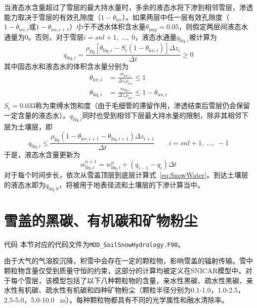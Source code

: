 当液态水含量超过了雪层的最大持水量时，多余的液态水将下渗到相邻雪层，渗透能力取决于雪层的有效孔隙度（$1-\theta_{\mathrm{ice}}$）。如果两层中任一层有效孔隙度（$1-\theta_{\mathrm{ice},i}$或$1-\theta_{\mathrm{ice},i+1}$）小于不透水体积含水量$\theta_{\mathrm{imp}}=0.05$，则假定两层间液态水通量为0。否则，对于雪层$i=snl+1,\ ...,\ 0$，液态水通量$q_{\mathrm{liq},i}$被计算为
\begin{equation}
  q_{\mathrm{liq},i}=\frac{\rho_{\mathrm{liq}}\left[\theta_{\mathrm{liq},i}-S_{\mathrm {r}} \left(1-\theta_{\mathrm{ice},i}\right)\right]\Delta z_{i} }{\Delta t}\geqslant 0
\end{equation}
其中固态水和液态水的体积含水量分别为
\begin{align}
  \theta_{\mathrm{ice},i}&=\frac{w_{\mathrm{ice},i}}{\Delta z_i \rho_{\mathrm{ice}}} \leqslant 1 \\
  \theta_{\mathrm{liq},i}&=\frac{w_{\mathrm{liq},i}}{\Delta z_i \rho_{\mathrm{ice}}} \leqslant 1-\theta_{\mathrm{ice},i}
\end{align}
$S_{\mathrm {r}} =0.033$称为束缚水饱和度（由于毛细管的滞留作用，渗透结束后雪层仍会保留一定含量的液态水）。$q_{\mathrm{liq},i}$同时也受到相邻下层最大持水量的限制，除非其相邻下层为土壤层，即
\begin{equation}
  q_{\mathrm{liq},i} \leqslant \frac{\rho_{\mathrm{liq}}\left(1-\theta_{\mathrm{ice},i+1}-\theta_{\mathrm{liq},i+1}\right)\Delta z_{i+1}}{\Delta t} \qquad i=snl+1,\ ...,\ -1
\end{equation}
于是，液态水含量更新为
\begin{equation}\label{eq:SnowWater}
  w_{\mathrm{liq},i}^{n+1}=w_{\mathrm{liq},i}^n+\left(q_{i-1}-q_i\right)\Delta t
\end{equation}
对于每个时间步长，依次从雪盖顶层到底层计算式~\eqref{eq:SnowWater}。到达土壤层的液态水即为$q_{\mathrm{liq,0}}$，将被用于地表径流和土壤层的下渗计算当中。

\section{雪盖的黑碳、有机碳和矿物粉尘}
\begin{mymdframed}{代码}
  本节对应的代码文件为\texttt{MOD\_SoilSnowHydrology.F90}。
\end{mymdframed}

由于大气的气溶胶沉降，积雪中会存在一定的颗粒物，影响雪盖的辐射传输。雪中颗粒物含量仅受到质量守恒的约束，这部分的计算均被定义在SNICAR模型中。对于每个雪层，该模型包括了以下八种颗粒物的含量，亲水性黑碳、疏水性黑碳、亲水性有机碳、疏水性有机碳和四种矿物粉尘（颗粒半径分别为0.1-1.0，1.0-2.5，2.5-5.0，5.0-10.0 \unit{\mu m}）。每种颗粒物都具有不同的光学属性和融水清除率。

